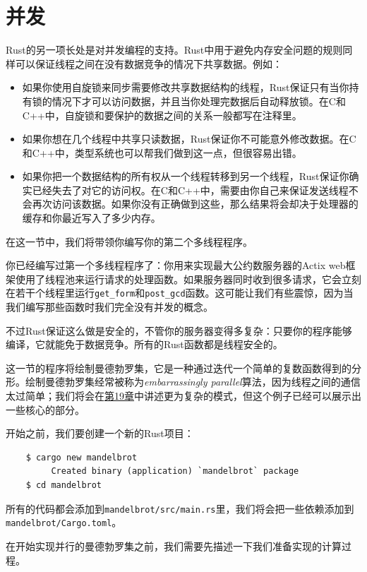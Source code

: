 \section{并发}
Rust的另一项长处是对并发编程的支持。Rust中用于避免内存安全问题的规则同样可以保证线程之间在没有数据竞争的情况下共享数据。例如：
\begin{itemize}
    \item 如果你使用自旋锁来同步需要修改共享数据结构的线程，Rust保证只有当你持有锁的情况下才可以访问数据，并且当你处理完数据后自动释放锁。在C和C++中，自旋锁和要保护的数据之间的关系一般都写在注释里。
    \item 如果你想在几个线程中共享只读数据，Rust保证你不可能意外修改数据。在C和C++中，类型系统也可以帮我们做到这一点，但很容易出错。
    \item 如果你把一个数据结构的所有权从一个线程转移到另一个线程，Rust保证你确实已经失去了对它的访问权。在C和C++中，需要由你自己来保证发送线程不会再次访问该数据。如果你没有正确做到这些，那么结果将会却决于处理器的缓存和你最近写入了多少内存。
\end{itemize}

在这一节中，我们将带领你编写你的第二个多线程程序。

你已经编写过第一个多线程程序了：你用来实现最大公约数服务器的Actix web框架使用了线程池来运行请求的处理函数。如果服务器同时收到很多请求，它会立刻在若干个线程里运行\texttt{get\_form}和\texttt{post\_gcd}函数。这可能让我们有些震惊，因为当我们编写那些函数时我们完全没有并发的概念。

不过Rust保证这么做是安全的，不管你的服务器变得多复杂：只要你的程序能够编译，它就能免于数据竞争。所有的Rust函数都是线程安全的。

这一节的程序将绘制曼德勃罗集，它是一种通过迭代一个简单的复数函数得到的分形。绘制曼德勃罗集经常被称为\emph{embarrassingly parallel}算法，因为线程之间的通信太过简单；我们将会在\hyperref[ch19]{第19章}中讲述更为复杂的模式，但这个例子已经可以展示出一些核心的部分。

开始之前，我们要创建一个新的Rust项目：
\begin{verbatim}
    $ cargo new mandelbrot
         Created binary (application) `mandelbrot` package
    $ cd mandelbrot
\end{verbatim}

所有的代码都会添加到\texttt{mandelbrot/src/main.rs}里，我们将会把一些依赖添加到\\
\texttt{mandelbrot/Cargo.toml}。

在开始实现并行的曼德勃罗集之前，我们需要先描述一下我们准备实现的计算过程。

